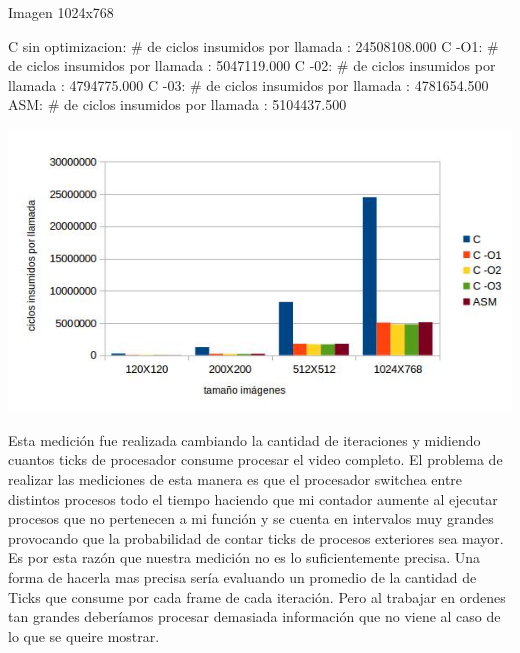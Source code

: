 \begin{itemize}
Imagen 1024x768\newline

C sin optimizacion: \# de ciclos insumidos por llamada : 24508108.000\newline
C -O1:   \# de ciclos insumidos por llamada : 5047119.000\newline
C -02: \# de ciclos insumidos por llamada : 4794775.000\newline
C -03:   \# de ciclos insumidos por llamada : 4781654.500\newline
ASM:   \# de ciclos insumidos por llamada : 5104437.500\newline

	  
	  
\begin{center}
 \includegraphics[scale=0.7]{tilesoptimo.jpg}
\end{center}

Esta medici\'on fue realizada cambiando la cantidad de iteraciones y midiendo cuantos ticks de procesador consume procesar el video completo. El 
problema de realizar las mediciones de esta manera es que el procesador switchea entre distintos procesos todo el tiempo haciendo que mi contador aumente
 al ejecutar procesos que no pertenecen a mi funci\'on y se cuenta en intervalos muy grandes provocando que la probabilidad de contar ticks de procesos
 exteriores sea mayor. Es por esta raz\'on que nuestra medici\'on no es lo suficientemente precisa. Una forma de hacerla mas precisa ser\'ia evaluando un
promedio de la cantidad de Ticks que consume por cada frame de cada iteraci\'on. Pero al trabajar en ordenes tan grandes deber\'iamos procesar demasiada
 informaci\'on que no viene al caso de lo que se queire mostrar.\newline

\end{itemize}

